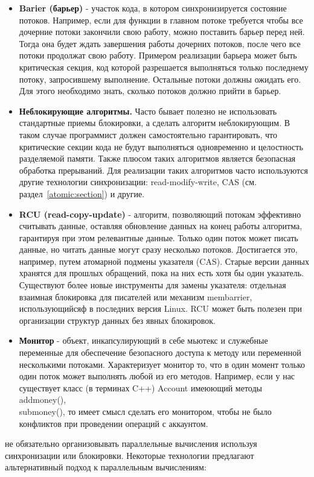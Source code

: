{\begin{itemize}
			\item\textbf{Barier (барьер)} - участок кода, в котором синхронизируется состояние потоков. Например, если для функции в главном потоке требуется чтобы все дочерние потоки закончили свою работу, можно поставить барьер перед ней. Тогда она будет ждать завершения работы дочерних потоков, после чего все потоки продолжат свою работу. Примером реализации барьера может быть критическая секция, код которой разрешается выполняться только последнему потоку, запросившему выполнение. Остальные потоки должны ожидать его. Для этого необходимо знать, сколько потоков должно прийти в барьер.
			\item\textbf{Неблокирующие алгоритмы.} Часто бывает полезно не использовать стандартные приемы блокировки, а сделать алгоритм неблокирующим. В таком случае программист должен самостоятельно гарантировать, что критические секции кода не будут выполняться одновременно и целостность разделяемой памяти. Также плюсом таких алгоритмов является безопасная обработка прерываний. Для реализации таких алгоритмов часто используются другие технологии синхронизации: read-modify-write, CAS (см. раздел~\ref{atomic:section}) и другие.
			\item\textbf{RCU (read-copy-update)} - алгоритм, позволяющий потокам эффективно считывать данные, оставляя обновление данных на конец работы алгоритма, гарантируя при этом релевантные данные. Только один поток может писать данные, но читать данные могут сразу несколько потоков. Достигается это, например, путем атомарной подмены указателя (CAS). Старые версии данных хранятся для прошлых обращений, пока на них есть хотя бы один указатель. Существуют более новые инструменты для замены указателя: отдельная взаимная блокировка для писателей или механизм membarrier, использующийсяф в последних версия Linux. RCU может быть полезен при организации структур данных без явных блокировок.
			\item\textbf{Монитор} - объект, инкапсулирующий в себе мьютекс и служебные переменные для обеспечение безопасного доступа к методу или переменной несколькими потоками. Характеризует монитор то, что в один момент только один поток может выполнять любой из его методов. Например, если у нас существует класс (в терминах C++) Account имеюющий методы add\textunderscore money(),\\sub\textunderscore money(), то имеет смысл сделать его монитором, чтобы не было конфликтов при проведении операций с аккаунтом.
		\end{itemize}
		 не обязательно организовывать параллельные вычисления используя синхронизации или блокировки. Некоторые технологии предлагают альтернативный подход к параллельным вычислениям: 
}

